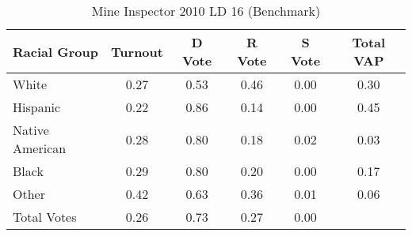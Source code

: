 \begin{table}[htb]
\begin{center}
\caption{Mine Inspector 2010 LD 16 (Benchmark)}
\label{smine_vap_ld_16_benchmark}
\begin{tabular}{lccccc}
  \hline
Racial Group & Turnout & D Vote & R Vote & S Vote & Total VAP \\ 
  \hline
White & 0.27 & 0.53 & 0.46 & 0.00 & 0.30 \\ 
  Hispanic & 0.22 & 0.86 & 0.14 & 0.00 & 0.45 \\ 
  Native American & 0.28 & 0.80 & 0.18 & 0.02 & 0.03 \\ 
  Black & 0.29 & 0.80 & 0.20 & 0.00 & 0.17 \\ 
  Other & 0.42 & 0.63 & 0.36 & 0.01 & 0.06 \\ 
  Total Votes & 0.26 & 0.73 & 0.27 & 0.00 &  \\ 
   \hline
\end{tabular}
\end{center}
\end{table}

